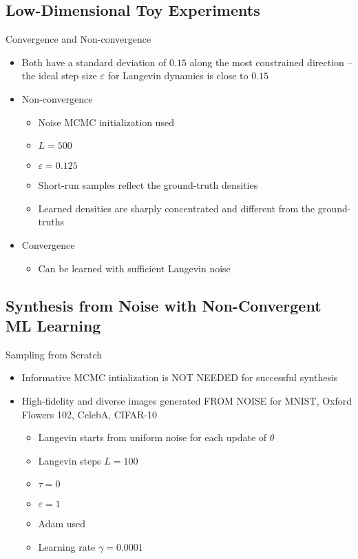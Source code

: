 \documentclass{beamer}
\begin{document}
\subsection{Low-Dimensional Toy Experiments}
\begin{frame}{Convergence and Non-convergence}
\begin{itemize}
\item Both have a standard deviation of $0.15$ along the most constrained direction -- the ideal step size $\varepsilon$ for Langevin dynamics is close to $0.15$
\item Non-convergence
\begin{itemize}
\item Noise MCMC initialization used
\item $L=500$
\item $\varepsilon=0.125$
\item Short-run samples reflect the ground-truth densities
\item Learned densities are sharply concentrated and different from the ground-truths
\end{itemize}
\item Convergence
\begin{itemize}
\item Can be learned with sufficient Langevin noise
\end{itemize}
\end{itemize}
\end{frame}

\subsection{Synthesis from Noise with Non-Convergent ML Learning}

\begin{frame}{Sampling from Scratch}
\begin{itemize}
\item Informative MCMC intialization is NOT NEEDED for successful synthesis
\item High-fidelity and diverse images generated FROM NOISE for MNIST, Oxford Flowers 102, CelebA, CIFAR-10
\begin{itemize}
\item Langevin starts from uniform noise for each update of $\theta$
\item Langevin steps $L=100$
\item $\tau=0$
\item $\varepsilon=1$
\item Adam used
\item Learning rate $\gamma=0.0001$
\end{itemize}
\end{itemize}
\end{frame}
\end{document}
